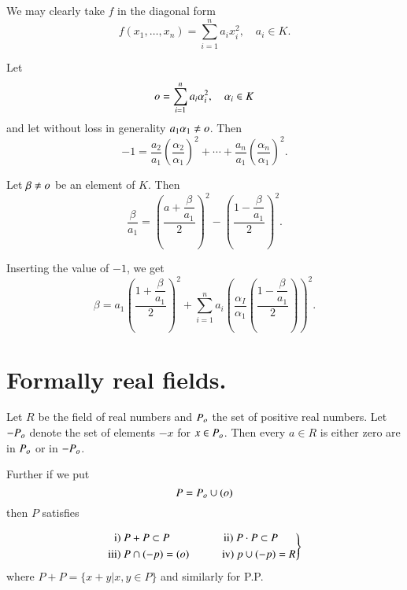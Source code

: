\begin{Proof}
We may clearly take $f$ in the diagonal form 
\begin{equation*}
f(x_1,\ldots,x_n)=\sum\limits_{i=1}^{n} a_ix^{2}_i,\quad a_i\in K.
\end{equation*}

Let
\begin{equation}\label{eqn6}
o=\sum\limits_{i=1}^{n}a_i\alpha_i^{2}, \quad \alpha_i\in K
\end{equation}
and let without loss in generality $a_1\alpha_1\neq o$. Then
\begin{equation}\label{eqn7}
-1=\dfrac{a_2}{a_1}\left(\dfrac{\alpha_2}{\alpha_1}\right)^{2}+\cdots+
\dfrac{a_n}{a_1}\left(\dfrac{\alpha_n}{\alpha_1}\right)^{2}.
\end{equation}

Let $\beta\neq o$ be an element of $K$. Then
\begin{equation*}
\dfrac{\beta}{a_1}=\left(\dfrac{a+\dfrac{\beta}{a_1}}{2}\right)^{2}-\left(\dfrac{1-\dfrac{\beta}{a_1}}{2}\right)^{2}.
\end{equation*}

Inserting the value of $-1$, we get 
\begin{equation*}
\beta=a_1\left(\dfrac{1+\dfrac{\beta}{a_1}}{2}\right)^{2}+\sum\limits_{i=1}^{n}
a_i\left(\dfrac{\alpha_I}{\alpha_1}\left(\dfrac{1-\dfrac{\beta}{a_1}}{2}\right)\right)^{2}.
\end{equation*}
\enprf
\end{Proof}

\section{Formally real fields.}\label{s2}

Let $R$ be the field of real numbers and $P_{o}$ the set of positive
real numbers. Let $-P_{o}$ denote the set of elements $-x$ for
$x\in P_{o}$. Then every $a\in R$ is either zero are in $P_{o}$
or in $-P_{o}$.

Further if we put
$$
P=P_{o}\cup (o)
$$
then $P$ satisfies


\begin{equation}\label{eqn8}
\left.
\begin{aligned}
\mbox{i) } P&+P\subset P &\qquad  \mbox{ii) } P&\cdot P \subset P\\
\mbox{iii) } P &\cap(-p) = (o) &\qquad  \mbox{iv) } p&\cup (-p)=R
\end{aligned}
\right\}
\end{equation}
where $P+P= \{x+y | x, y \in P\}$ and similarly for P.P.

